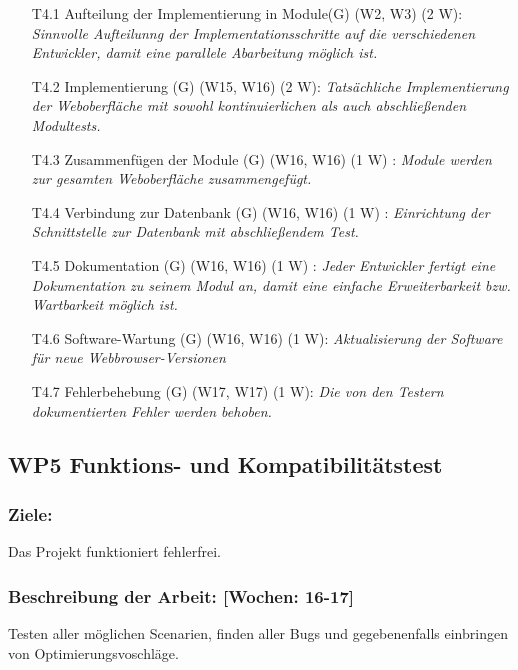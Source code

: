 \documentclass{scrreprt}
\begin{document}
\begin{enumerate}
\item [T4.1] Aufteilung der Implementierung in Module(G) (W2, W3) (2 W): \emph{ Sinnvolle Aufteilunng der Implementationsschritte auf die verschiedenen Entwickler, damit eine parallele Abarbeitung möglich ist.}
\item [T4.2] Implementierung (G) (W15, W16) (2 W): \emph{ Tatsächliche Implementierung der Weboberfläche mit sowohl kontinuierlichen als auch abschließenden Modultests.}
\item [T4.3] Zusammenfügen der Module (G) (W16, W16) (1 W) : \emph{ Module werden zur gesamten Weboberfläche zusammengefügt.}
\item [T4.4] Verbindung zur Datenbank (G) (W16, W16) (1 W) : \emph{ Einrichtung der Schnittstelle zur Datenbank mit abschließendem Test.}
\item [T4.5] Dokumentation (G) (W16, W16) (1 W) : \emph{ Jeder Entwickler fertigt eine Dokumentation zu seinem Modul an, damit eine einfache Erweiterbarkeit bzw. Wartbarkeit möglich ist.}
\item [T4.6] Software-Wartung (G) (W16, W16) (1 W): \emph{ Aktualisierung der Software für neue Webbrowser-Versionen}
\item [T4.7] Fehlerbehebung (G) (W17, W17) (1 W): \emph{Die von den Testern dokumentierten Fehler werden behoben.}

\end{enumerate}

\subsection*{WP5 Funktions- und Kompatibilitätstest}

\subsubsection{Ziele:} Das Projekt funktioniert fehlerfrei.
\subsubsection{Beschreibung der Arbeit: [Wochen: 16-17]} Testen aller möglichen Scenarien, finden aller Bugs und gegebenenfalls einbringen von Optimierungsvoschläge.
\end{document}
